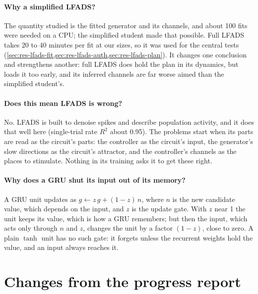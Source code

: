 \documentclass[11pt,a4paper]{article}
\begin{document}
\paragraph{Why a simplified LFADS?} The quantity studied is the fitted generator and its channels, and about 100 fits were needed on a CPU; the simplified student made that possible. Full LFADS takes 20 to 40 minutes per fit at our sizes, so it was used for the central tests (\cref{sec:res-lfads-fit,sec:res-lfads-auth,sec:res-lfads-plan}). It changes one conclusion and strengthens another: full LFADS does hold the plan in its dynamics, but loads it too early, and its inferred channels are far worse aimed than the simplified student's.

\paragraph{Does this mean LFADS is wrong?} No. LFADS is built to denoise spikes and describe population activity, and it does that well here (single-trial rate $R^2$ about 0.95). The problems start when its parts are read as the circuit's parts: the controller as the circuit's input, the generator's slow directions as the circuit's attractor, and the controller's channels as the places to stimulate. Nothing in its training asks it to get these right.

\paragraph{Why does a GRU shut its input out of its memory?} A GRU unit updates as $g\leftarrow z\,g + (1-z)\,n$, where $n$ is the new candidate value, which depends on the input, and $z$ is the update gate. With $z$ near 1 the unit keeps its value, which is how a GRU remembers; but then the input, which acts only through $n$ and $z$, changes the unit by a factor $(1-z)$, close to zero. A plain $\tanh$ unit has no such gate: it forgets unless the recurrent weights hold the value, and an input always reaches it.

\section{Changes from the progress report}\label{app:changes}
\end{document}
